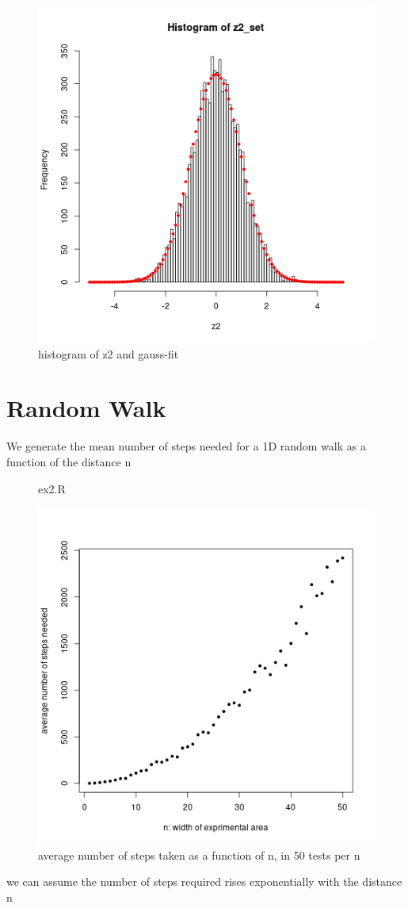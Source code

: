 \documentclass[11pt, a4paper, reqno]{scrartcl}
\begin{document}
        \begin{figure}[H]
            \includegraphics[height=.5\paperheight]{ex12.png}
            \caption{histogram of z2 and gauss-fit}
        \end{figure}     
    \newpage
    
    \section{Random Walk}
        We generate the mean number of steps needed for a 1D random walk as a function of the distance n
        
        
        \begin{figure}[H]
            
            \caption{ex2.R}
        \end{figure}
    
        \begin{figure}[H]
            \includegraphics[height=.5\paperheight]{ex2.png}
            \caption{average number of steps taken as a function of n, in 50 tests per n}
        \end{figure}
    
        we can assume the number of steps required rises exponentially with the distance n
\end{document}
